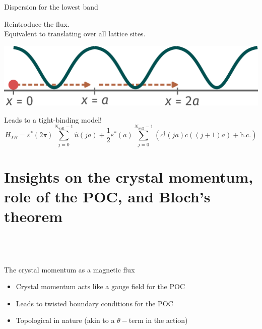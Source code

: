 \documentclass[aspectratio=169]{beamer}
\begin{document}
\begin{frame}{Dispersion for the lowest band}
{	\begin{minipage}{0.3\textwidth}
	Reintroduce the flux.\\[10pt]
	Equivalent to translating over all lattice sites.\\[10pt]
	\end{minipage}
	\hspace*{\fill}
	\begin{minipage}{0.6\textwidth}
	\includegraphics[width=\textwidth]{tightbinding.pdf}
	\end{minipage}

	\vspace*{\fill}
	Leads to a tight-binding model!
	\[H_{TB} = \varepsilon^{*}(2\pi)\sum_{j=0}^{N_\text{well}-1}\hat n(ja) + \frac{1}{2}\varepsilon^{*}(a)\sum_{j=0}^{N_\text{well}-1}\left(c^\dagger(ja)c((j+1)a) + \text{h.c.}\right)\]
}
\end{frame}

\section{Insights on the crystal momentum, role of the POC, and Bloch’s theorem}
\subsection{~}

\begin{frame}{The crystal momentum as a magnetic flux}
\begin{itemize}
	\item Crystal momentum acts like a gauge field for the POC\\[10pt]
	\item Leads to twisted boundary conditions for the POC\\[10pt]
	\item Topological in nature (akin to a \(\theta-\)term in the action)
\end{itemize}
\end{frame}
\end{document}
